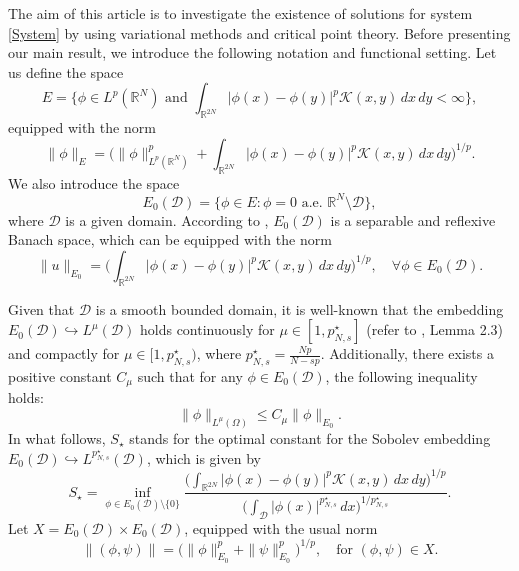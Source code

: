 \documentclass[10pt,a4paper]{amsart}
\numberwithin{equation}{section}
\begin{document}
The aim of this article is to investigate the existence of solutions for 
system \eqref{System} by  using variational methods and critical point theory. 
Before presenting our main result, we introduce the following notation and
functional setting. Let us define the space
$$
E=\Big\lbrace \phi\in L^p(\mathbb{R}^N) \text{ and }
  \int_{\mathbb{R}^{2N}}|\phi(x)-\phi(y)|^p \mathcal{K}(x,y)\,dx\,dy
  <\infty\Big\rbrace,
$$
equipped with the norm
$$
\| \phi\|_{E}=\Big(\| \phi\|_{L^p(\mathbb{R}^N)}^{p}
+\int_{\mathbb{R}^{2N}}|\phi(x)-\phi(y)|^p \mathcal{K}(x,y)\,dx\,dy
\Big)^{1/p}.
$$
We also introduce the  space
$$
E_0(\mathcal{D})=\Big\lbrace  \phi\in E:
 \phi=0 \text{ a.e. }  \mathbb{R}^N\setminus\mathcal{D}\Big\rbrace,
$$
where $\mathcal{D}$ is a given domain.
 According to \cite[Lemma 4]{z}, $E_0(\mathcal{D})$ is a separable and reflexive 
 Banach space, which can be equipped with the  norm
\begin{equation*}
\| u\|_{E_0}=\Big(\int_{\mathbb{R}^{2N}}|\phi(x)-\phi(y)
|^p \mathcal{K}(x,y)\,dx\,dy\Big)^{1/p},\quad \forall \phi\in E_0(\mathcal{D}).
\end{equation*}

Given that $\mathcal{D}$ is a smooth bounded domain, it is well-known that the embedding $E_0(\mathcal{D})\hookrightarrow L^\mu(\mathcal{D})$ holds continuously for $\mu\in [1,p^\star_{N,s}]$ (refer to \cite{nez}, Lemma 2.3) and compactly for $\mu\in [1,p^\star_{N,s})$, where $p^\star_{N,s}=\frac{Np}{N-sp}$. Additionally, there exists a positive constant $C_\mu$ such that for any $\phi\in E_0(\mathcal{D})$, the following inequality holds:
\begin{equation}\label{sobolevinequaity}
\| \phi\|_{L^\mu(\Omega)}\leq C_\mu \| \phi\|_{E_0}.
\end{equation}
In what follows, $S_\star$ stands for the optimal constant for the Sobolev embedding 
$E_0(\mathcal{D})\hookrightarrow L^{p^\star_{N,s}}(\mathcal{D})$, 
which is given by
\begin{equation}\label{S1}
S_\star=\inf_{\phi\in E_0(\mathcal{D})\setminus \lbrace 0\rbrace}
\frac{{\big(\int_{\mathbb{R}^{2N}}|\phi(x)-\phi(y)|^p\mathcal{K}(x,y)\,dx\,dy
\big)^{1/p}}}{{\big(\int_\mathcal{D} |\phi(x)|^{p^\star_{N,s}}\,dx
\big)^{1/p^\star_{N,s}}}}.
\end{equation}
Let $X=E_0(\mathcal{D})\times E_0(\mathcal{D})$, equipped with the usual norm 
$$
\| (\phi,\psi)\|=\Big(\| \phi\|_{E_0}^p+\| \psi\|_{E_0}^p\Big)^{1/p},
\quad \text{for } (\phi,\psi)\in X.
$$
\end{document}
